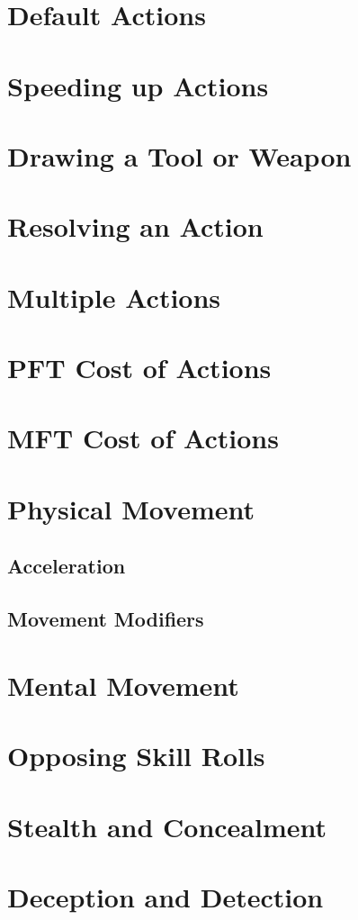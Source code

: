 \section{Default Actions}
\section{Speeding up Actions}
\section{Drawing a Tool or Weapon}
\section{Resolving an Action}
\section{Multiple Actions}
\section{PFT Cost of Actions}
\section{MFT Cost of Actions}
\section{Physical Movement}
\subsection{Acceleration}
\subsection{Movement Modifiers}
\section{Mental Movement}
\section{Opposing Skill Rolls}
\section{Stealth and Concealment}
\section{Deception and Detection}
